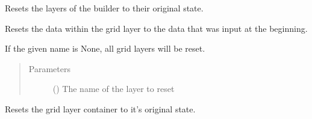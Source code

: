 \documentclass[letterpaper,10pt,english]{sphinxmanual}
\begin{document}
\begin{fulllineitems}
\begin{fulllineitems}
\end{fulllineitems}


\begin{fulllineitems}
\label{\detokenize{builder:geohexviz.builder.PlotBuilder.reset_data}}
\sphinxAtStartPar
Resets the layers of the builder to their original state.

\end{fulllineitems}


\begin{fulllineitems}
\label{\detokenize{builder:geohexviz.builder.PlotBuilder.reset_grid_data}}
\sphinxAtStartPar
Resets the data within the grid layer to the data that was input at the beginning.

\sphinxAtStartPar
If the given name is None, all grid layers will be reset.
\begin{quote}\begin{description}
\item[{Parameters}] \leavevmode
\sphinxAtStartPar
{} () \textendash{} The name of the layer to reset

\end{description}\end{quote}

\end{fulllineitems}


\begin{fulllineitems}
\label{\detokenize{builder:geohexviz.builder.PlotBuilder.reset_grids}}
\sphinxAtStartPar
Resets the grid layer container to it’s original state.


\end{fulllineitems}
\end{fulllineitems}
\end{document}

